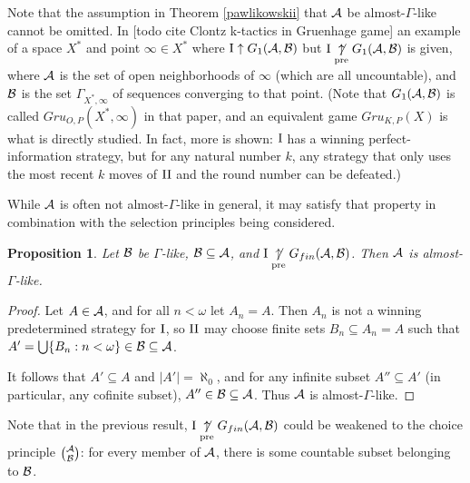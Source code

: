 \documentclass{amsart}
\theoremstyle{plain}
\newtheorem{proposition}[theorem]{Proposition}
\theoremstyle{definition}
\theoremstyle{remark}
\theoremstyle{plain}
\theoremstyle{definition}
\theoremstyle{remark}
\begin{document}
Note that the assumption in Theorem \ref{pawlikowskii} that \(\mathcal{A}\)
be almost-\(\Gamma\)-like cannot be omitted. In
[todo cite Clontz k-tactics in Gruenhage game]
an example of a space \(X^*\) and point \(\infty\in X^*\) 
where \(\mathrm{I}\uparrow G_1(\mathcal{A},\mathcal{B})\) but
\(\mathrm{I}\underset{\text{pre}}{\not\uparrow} G_1(\mathcal{A},\mathcal{B})\) is given, where \(\mathcal{A}\) is
the set of open neighborhoods of \(\infty\) 
(which are all uncountable), 
and \(\mathcal{B}\) is the set \(\Gamma_{X^*,\infty}\) of sequences converging to that point.
(Note that \(G_1(\mathcal{A},\mathcal{B})\) is called \(Gru_{O,P}(X^*,\infty)\) in that
paper, and an equivalent game \(Gru_{K,P}(X)\) is what is directly
studied. In fact, more is shown: \(\mathrm{I}\) has a winning perfect-information
strategy, but for any natural number \(k\), any strategy that only uses 
the most recent \(k\) moves of \(\mathrm{II}\) and the round number
can be defeated.)

While \(\mathcal{A}\) is often not almost-\(\Gamma\)-like in general,
it may satisfy that property in combination with the selection principles
being considered.

\begin{proposition}\label{auto-asl}
Let \(\mathcal{B}\) be \(\Gamma\)-like, \(\mathcal{B}\subseteq\mathcal{A}\),
and \(\mathrm{I}\underset{\text{pre}}{\not\uparrow} G_{fin}(\mathcal{A},\mathcal{B})\). Then
\(\mathcal{A}\) is almost-\(\Gamma\)-like.
\end{proposition}
\begin{proof}
Let \(A\in\mathcal{A}\), and for all \(n<\omega\) let \(A_n=A\).
Then \(A_n\) is not a winning predetermined strategy for
\(\mathrm{I}\), so \(\mathrm{II}\) may choose finite sets
\(B_n\subseteq A_n=A\) such that 
\(A'=\bigcup\{B_n:n<\omega\}\in\mathcal{B}\subseteq\mathcal{A}\).

It follows that \(A'\subseteq A\) and \(|A'|=\aleph_0\), 
and for any infinite subset
\(A''\subseteq A'\) (in particular, any cofinite subset),
\(A''\in\mathcal{B}\subseteq\mathcal{A}\). Thus \(\mathcal{A}\) is almost-\(\Gamma\)-like.
\end{proof}

Note that in the previous result, 
\(\mathrm{I}\underset{\text{pre}}{\not\uparrow} G_{fin}(\mathcal{A},\mathcal{B})\) could be weakened
to the choice principle \({\mathcal{A}}\choose{\mathcal{B}}\): for every
member of \(\mathcal{A}\), there is some countable subset belonging to \(\mathcal{B}\).
\end{document}
